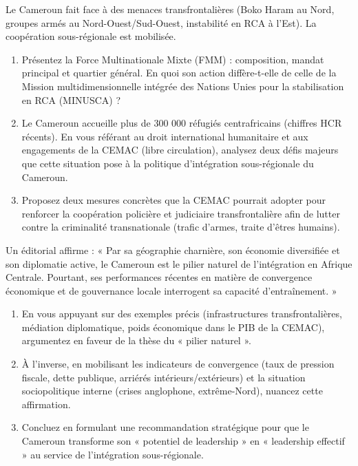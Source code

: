 \documentclass[11pt]{article}
\begin{document}
\begin{exercice}
Le Cameroun fait face à des menaces transfrontalières (Boko Haram au Nord, groupes armés au Nord-Ouest/Sud-Ouest, instabilité en RCA à l'Est). La coopération sous-régionale est mobilisée.
\begin{enumerate}
    \item Présentez la Force Multinationale Mixte (FMM) : composition, mandat principal et quartier général. En quoi son action diffère-t-elle de celle de la Mission multidimensionnelle intégrée des Nations Unies pour la stabilisation en RCA (MINUSCA) ?
    \item Le Cameroun accueille plus de 300 000 réfugiés centrafricains (chiffres HCR récents). En vous référant au droit international humanitaire et aux engagements de la CEMAC (libre circulation), analysez deux défis majeurs que cette situation pose à la politique d'intégration sous-régionale du Cameroun.
    \item Proposez deux mesures concrètes que la CEMAC pourrait adopter pour renforcer la coopération policière et judiciaire transfrontalière afin de lutter contre la criminalité transnationale (trafic d'armes, traite d'êtres humains).
\end{enumerate}
\end{exercice}

\begin{exercice}
Un éditorial affirme : « Par sa géographie charnière, son économie diversifiée et son diplomatie active, le Cameroun est le pilier naturel de l'intégration en Afrique Centrale. Pourtant, ses performances récentes en matière de convergence économique et de gouvernance locale interrogent sa capacité d'entraînement. »
\begin{enumerate}
    \item En vous appuyant sur des exemples précis (infrastructures transfrontalières, médiation diplomatique, poids économique dans le PIB de la CEMAC), argumentez en faveur de la thèse du « pilier naturel ».
    \item À l'inverse, en mobilisant les indicateurs de convergence (taux de pression fiscale, dette publique, arriérés intérieurs/extérieurs) et la situation sociopolitique interne (crises anglophone, extrême-Nord), nuancez cette affirmation.
    \item Concluez en formulant une recommandation stratégique pour que le Cameroun transforme son « potentiel de leadership » en « leadership effectif » au service de l'intégration sous-régionale.
\end{enumerate}
\end{exercice}
\end{document}
